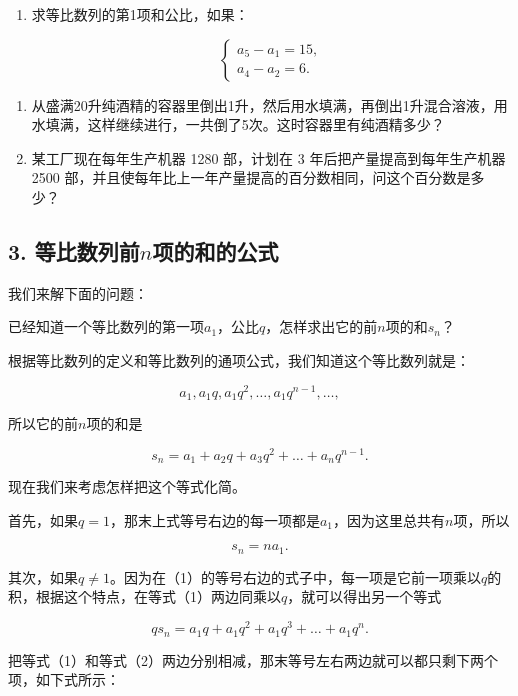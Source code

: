 \begin{enumerate}[start=6,label={*\arabic*.}]
\item
  求等比数列的第1项和公比，如果：

\[
\left\{ \begin{array}{l} a_{5} - a_{1} = 15, \\ a_{4} - a_{2} = 6. \end{array} \right.
\]

\end{enumerate}
\begin{enumerate}[start=7]
\item
  从盛满20升纯酒精的容器里倒出1升，然后用水填满，再倒出1升混合溶液，用水填满，这样继续进行，一共倒了5次。这时容器里有纯酒精多少？
\item
  某工厂现在每年生产机器 1280 部，计划在 3 年后把产量提高到每年生产机器
  2500 部，并且使每年比上一年产量提高的百分数相同，问这个百分数是多少？
\end{enumerate}

\subsection{\texorpdfstring{3. 等比数列前\(n\)项的和的公式}{3. 等比数列前n项的和的公式}}

我们来解下面的问题：

已经知道一个等比数列的第一项\(a_1\)，公比\(q\)，怎样求出它的前\(n\)项的和\(s_n\)？

根据等比数列的定义和等比数列的通项公式，我们知道这个等比数列就是：

\[
a_{1}, a_{1} q, a_{1} q^{2}, \dots, a_{1} q^{n - 1}, \dots,
\]

所以它的前\(n\)项的和是

\[
s_{n} = a_{1} + a_{2} q + a_{3} q^{2} + \dots + a_{n} q^{n - 1}. \tag {1}
\]

现在我们来考虑怎样把这个等式化简。

首先，如果\(q = 1\)，那末上式等号右边的每一项都是\(a_{1}\)，因为这里总共有\(n\)项，所以

\[
s_{n} = n a_{1}.
\]

其次，如果\(q \neq 1\)。因为在（1）的等号右边的式子中，每一项是它前一项乘以\(q\)的积，根据这个特点，在等式（1）两边同乘以\(q\)，就可以得出另一个等式

\[
q s_{n} = a_{1} q + a_{1} q^{2} + a_{1} q^{3} + \dots + a_{1} q^{n}. \tag {2}
\]

把等式（1）和等式（2）两边分别相减，那末等号左右两边就可以都只剩下两个项，如下式所示：

